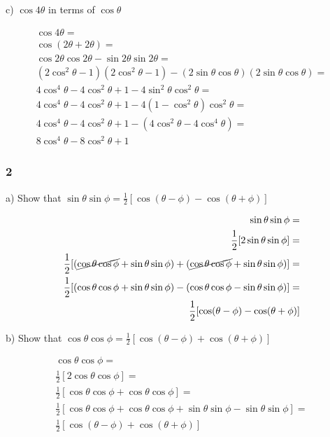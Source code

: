 \documentclass[]{report}
\begin{document}
c) $\cos4\theta$ in terms of $\cos \theta$

\begin{align*}
\cos4\theta = \\
\cos(2\theta + 2\theta) = \\
\cos2\theta\cos2\theta - \sin2\theta\sin2\theta = \\
 (2\cos^2\theta -1)(2\cos^2\theta - 1) - (2\sin\theta\cos\theta)(2\sin\theta\cos\theta) = \\
 4\cos^4\theta -4\cos^2\theta + 1 - 4\sin^2\theta\cos^2\theta = \\
 4\cos^4\theta -4\cos^2\theta + 1 - 4(1 - \cos^2\theta)\cos^2\theta = \\
 4\cos^4\theta -4\cos^2\theta + 1 - (4\cos^2\theta - 4\cos^4\theta) = \\
 8\cos^4\theta  - 8\cos^2\theta + 1
\end{align*}

\subsubsection{2}

a) Show that $\sin\theta\sin\phi = \frac{1}{2}[\cos(\theta-\phi) - \cos(\theta+\phi)]$

\begin{align*}
\sin\theta\sin\phi = \\
\frac{1}{2}{[2\sin\theta\sin\phi]} = \\
\frac{1}{2}[(\cancel{\cos\theta\cos\phi} + \sin\theta\sin\phi) + (\cancel{\cos\theta\cos\phi} + \sin\theta\sin\phi)] = \\
\frac{1}{2}[(\cos\theta\cos\phi + \sin\theta\sin\phi) - (\cos\theta\cos\phi - \sin\theta\sin\phi)] = \\
\frac{1}{2}[\cos(\theta-\phi) - \cos(\theta+\phi)]
\end{align*}

b) Show that $\cos\theta\cos\phi = \frac{1}{2}[\cos(\theta - \phi) + \cos(\theta+\phi)]$

\begin{align*}
\cos\theta\cos\phi = \\
\frac{1}{2}[2\cos\theta\cos\phi] = \\
\frac{1}{2}[\cos\theta\cos\phi + \cos\theta\cos\phi] = \\
\frac{1}{2}[\cos\theta\cos\phi + \cos\theta\cos\phi + \sin\theta\sin\phi - \sin\theta\sin\phi] = \\
\frac{1}{2}[\cos(\theta - \phi) + \cos(\theta + \phi)]
\end{align*}
\end{document}
